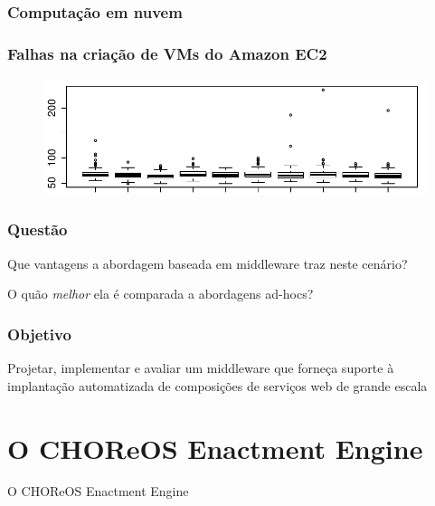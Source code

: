 \documentclass{beamer}
\newcommand\sectiontitle[1]{\begin{center}\huge#1\end{center}}
\begin{document}

\begin{frame}
\frametitle{Computação em nuvem}


\end{frame}


\begin{frame}
\frametitle{Falhas na criação de VMs do Amazon EC2}

\begin{figure}
\includegraphics[width=1\linewidth]{img/ec2_boxplot}
\end{figure}


\end{frame}


\begin{frame}
\frametitle{Questão}

Que vantagens a abordagem baseada em middleware traz neste cenário?

O quão \emph{melhor} ela é comparada a abordagens ad-hocs?

\end{frame}


\begin{frame}
\frametitle{Objetivo}

Projetar, implementar e avaliar um middleware que forneça suporte à implantação automatizada de composições de serviços web de grande escala

\end{frame}


\section{O CHOReOS Enactment Engine}

\begin{frame}

\sectiontitle{O CHOReOS Enactment Engine}

\end{frame}
\end{document}
